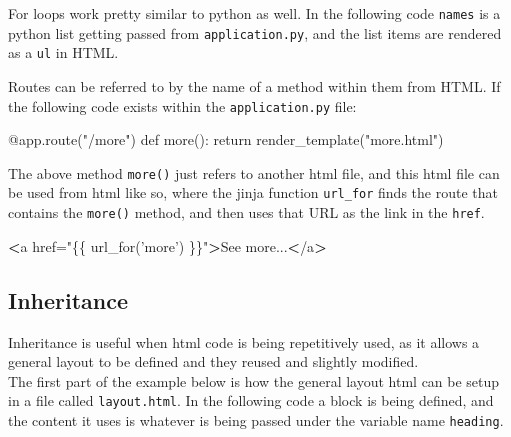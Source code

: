 \documentclass[]{book}
\newenvironment{Shaded}{\begin{snugshade}}{\end{snugshade}}
\newcommand{\StringTok}[1]{\textcolor[rgb]{0.31,0.60,0.02}{#1}}
\newcommand{\OperatorTok}[1]{\textcolor[rgb]{0.81,0.36,0.00}{\textbf{#1}}}
\newcommand{\BuiltInTok}[1]{#1}
\newcommand{\ExtensionTok}[1]{#1}
\newcommand{\NormalTok}[1]{#1}
\begin{document}
For loops work pretty similar to python as well. In the following code
\texttt{names} is a python list getting passed from
\texttt{application.py}, and the list items are rendered as a
\texttt{ul} in HTML.

\begin{Shaded}
\end{Shaded}

Routes can be referred to by the name of a method within them from HTML.
If the following code exists within the \texttt{application.py} file:

\begin{Shaded}
\begin{Highlighting}[]
\ExtensionTok{@app.route}\NormalTok{(}\StringTok{"/more"}\NormalTok{)}
\ExtensionTok{def}\NormalTok{ more()}\BuiltInTok{:}
    \BuiltInTok{return}\NormalTok{ render_template(}\StringTok{"more.html"}\NormalTok{)}
\end{Highlighting}
\end{Shaded}

The above method \texttt{more()} just refers to another html file, and
this html file can be used from html like so, where the jinja function
\texttt{url\_for} finds the route that contains the \texttt{more()}
method, and then uses that URL as the link in the \texttt{href}.

\begin{Shaded}
\begin{Highlighting}[]
\OperatorTok{<}\ExtensionTok{a}\NormalTok{ href=}\StringTok{"\{\{ url_for('more') \}\}"}\OperatorTok{>}\NormalTok{See more...}\OperatorTok{<}\NormalTok{/a}\OperatorTok{>}
\end{Highlighting}
\end{Shaded}

\subsection{Inheritance}\label{inheritance-1}

Inheritance is useful when html code is being repetitively used, as it
allows a general layout to be defined and they reused and slightly
modified.\\
The first part of the example below is how the general layout html can
be setup in a file called \texttt{layout.html}. In the following code a
block is being defined, and the content it uses is whatever is being
passed under the variable name \texttt{heading}.
\end{document}
